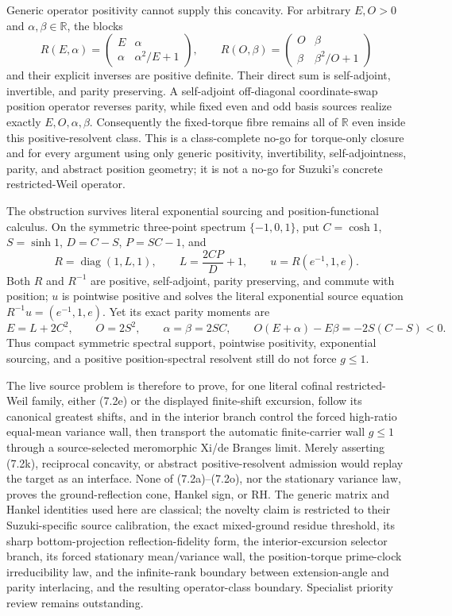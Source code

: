 \documentclass[11pt]{article}
\theoremstyle{definition}
\theoremstyle{remark}
\newcommand{\R}{\mathbb R}
\begin{document}
Generic operator positivity cannot supply this concavity.  For arbitrary $E,O>0$ and
$\alpha,\beta\in\R$, the blocks
\[
 R(E,\alpha)=
 \begin{pmatrix}E&\alpha\\ \alpha&\alpha^2/E+1\end{pmatrix},
 \qquad
 R(O,\beta)=
 \begin{pmatrix}O&\beta\\ \beta&\beta^2/O+1\end{pmatrix}
 \tag{7.2m}
\]
and their explicit inverses are positive definite.  Their direct sum is self-adjoint,
invertible, and parity preserving.  A self-adjoint off-diagonal coordinate-swap position
operator reverses parity, while fixed even and odd basis sources realize exactly
$E,O,\alpha,\beta$.  Consequently the fixed-torque fibre remains all of $\R$ even inside this
positive-resolvent class.  This is a class-complete no-go for torque-only closure and for every
argument using only generic positivity, invertibility, self-adjointness, parity, and abstract
position geometry; it is not a no-go for Suzuki's concrete restricted-Weil operator.

The obstruction survives literal exponential sourcing and position-functional calculus.  On the
symmetric three-point spectrum $\{-1,0,1\}$, put
$C=\cosh1$, $S=\sinh1$, $D=C-S$, $P=SC-1$, and
\[
 R=\operatorname{diag}(1,L,1),\qquad
 L=\frac{2CP}{D}+1,\qquad
 u=R(e^{-1},1,e).
 \tag{7.2n}
\]
Both $R$ and $R^{-1}$ are positive, self-adjoint, parity preserving, and commute with position;
$u$ is pointwise positive and solves the literal exponential source equation
$R^{-1}u=(e^{-1},1,e)$.  Yet its exact parity moments are
\[
 E=L+2C^2,\qquad O=2S^2,\qquad \alpha=\beta=2SC,
\qquad O(E+\alpha)-E\beta=-2S(C-S)<0.
 \tag{7.2o}
\]
Thus compact symmetric spectral support, pointwise positivity, exponential sourcing, and a
positive position-spectral resolvent still do not force $g\leq1$.

The live source problem is therefore to prove, for one literal cofinal restricted-Weil family,
either (7.2e) or the displayed finite-shift excursion, follow its canonical greatest shifts, and
in the interior branch control the forced high-ratio equal-mean variance wall, then
transport the automatic finite-carrier wall
$g\leq1$ through a source-selected meromorphic Xi/de Branges limit.  Merely asserting (7.2k),
reciprocal concavity, or abstract positive-resolvent admission would replay the target as an
interface.  None of (7.2a)--(7.2o), nor the stationary variance law, proves the
ground-reflection cone, Hankel sign, or RH.
The generic matrix and Hankel identities used here are classical; the novelty claim is restricted
to their Suzuki-specific source calibration, the exact mixed-ground residue threshold, its sharp
bottom-projection reflection-fidelity form, the interior-excursion selector branch, its forced
stationary mean/variance wall, the position-torque prime-clock irreducibility law, and the
infinite-rank boundary between extension-angle and parity interlacing, and the resulting
operator-class boundary.  Specialist priority
review remains outstanding.
\end{document}
